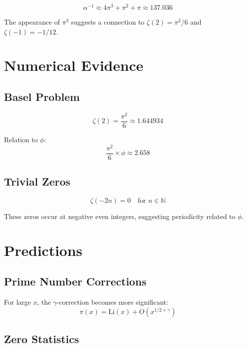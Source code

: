 \documentclass[12pt,a4paper]{article}
\begin{document}
\begin{equation}
\alpha^{-1} \approx 4\pi^3 + \pi^2 + \pi \approx 137.036
\end{equation}

The appearance of $\pi^3$ suggests a connection to $\zeta(2) = \pi^2/6$ and $\zeta(-1) = -1/12$.

\section{Numerical Evidence}

\subsection{Basel Problem}

\begin{equation}
\zeta(2) = \frac{\pi^2}{6} \approx 1.644934
\end{equation}

Relation to $\phi$:
\begin{equation}
\frac{\pi^2}{6} \times \phi \approx 2.658
\end{equation}

\subsection{Trivial Zeros}

\begin{equation}
\zeta(-2n) = 0 \quad \text{for } n \in \mathbb{N}
\end{equation}

These zeros occur at negative even integers, suggesting periodicity related to $\phi$.

\section{Predictions}

\subsection{Prime Number Corrections}

For large $x$, the $\gamma$-correction becomes more significant:
\begin{equation}
\pi(x) = \text{Li}(x) + O(x^{1/2+\gamma})
\end{equation}

\subsection{Zero Statistics}
\end{document}
